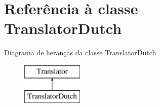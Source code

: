 \hypertarget{class_translator_dutch}{\section{Referência à classe Translator\-Dutch}
\label{class_translator_dutch}
}
Diagrama de heranças da classe Translator\-Dutch\begin{figure}[H]
\begin{center}
\leavevmode
\includegraphics[height=2.000000cm]{class_translator_dutch}
\end{center}
\end{figure}
